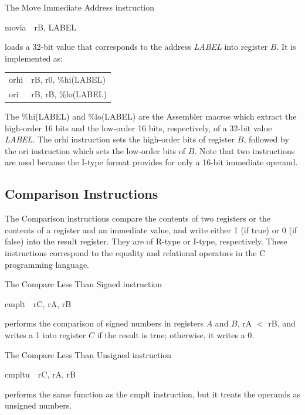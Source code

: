 \documentclass[11pt, twoside, pdftex]{article}
\begin{document}
\noindent
The Move Immediate Address instruction
\begin{center}
{\sf movia~~rB, LABEL}
\end{center}
\noindent
loads a 32-bit value that corresponds to the address {\it LABEL} into register $B$.
It is implemented as:
\begin{center}
\begin{tabular}{ll}
{\sf orhi} & {\sf rB, r0, \%hi(LABEL)} \\
{\sf ori} & {\sf rB, rB, \%lo(LABEL)}
\end{tabular}
\end{center} 
\noindent
The {\sf \%hi(LABEL)} and {\sf \%lo(LABEL)} are the Assembler macros which extract the
high-order 16 bits and the low-order 16 bits, respectively, of a 32-bit value {\it LABEL}.
The {\sf orhi} instruction sets the high-order bits of register $B$, followed
by the {\sf ori} instruction which sets the low-order bits of $B$. Note that 
two instructions are used because the I-type format provides for only a 16-bit
immediate operand.

\subsection{Comparison Instructions}

The Comparison instructions compare the contents of two registers or the contents of a
register and an immediate value, and write either 1 (if true) or 0 (if false) into 
the result register. They are of R-type or I-type, respectively. 
These instructions correspond to the equality and relational operators in the
C programming language. 
 

\noindent
The Compare Less Than Signed instruction
\begin{center}
{\sf cmplt~~rC, rA, rB}
\end{center}
\noindent
performs the comparison of signed numbers in registers $A$ and $B$, {\sf rA $<$ rB}, and writes 
a 1 into register $C$ if the result is true; otherwise, it writes a 0.
 

\noindent
The Compare Less Than Unsigned instruction
\begin{center}
{\sf cmpltu~~rC, rA, rB}
\end{center}
\noindent
performs the same function as the {\sf cmplt} instruction, but it treats the operands as
unsigned numbers.
 
\end{document}
